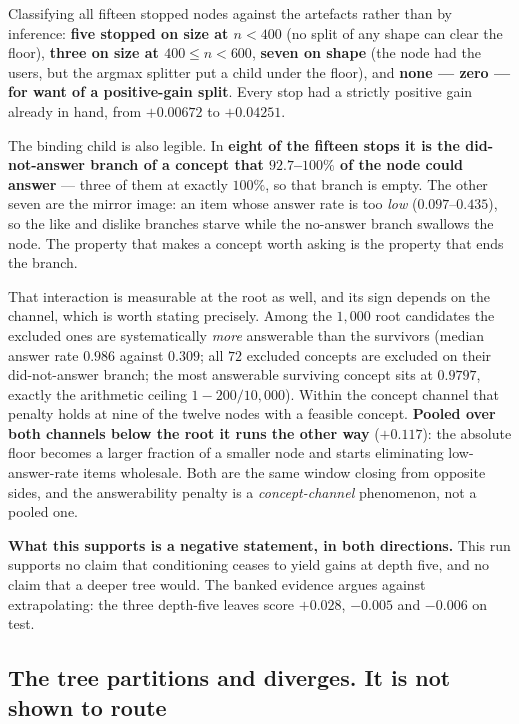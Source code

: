 \documentclass[11pt]{article}
\begin{document}
Classifying all fifteen stopped nodes against the artefacts rather than by inference: \textbf{five
stopped on size at $n<400$} (no split of any shape can clear the floor), \textbf{three on size at
$400\le n<600$}, \textbf{seven on shape} (the node had the users, but the argmax splitter put a child
under the floor), and \textbf{none --- zero --- for want of a positive-gain split}. Every stop had a
strictly positive gain already in hand, from $+0.00672$ to $+0.04251$.

The binding child is also legible. In \textbf{eight of the fifteen stops it is the did-not-answer
branch of a concept that $92.7$--$100\%$ of the node could answer} --- three of them at exactly
$100\%$, so that branch is empty. The other seven are the mirror image: an item whose answer rate is
too \emph{low} ($0.097$--$0.435$), so the like and dislike branches starve while the no-answer branch
swallows the node. The property that makes a concept worth asking is the property that ends the
branch.

That interaction is measurable at the root as well, and its sign depends on the channel, which is
worth stating precisely. Among the $1{,}000$ root candidates
the excluded ones are systematically \emph{more} answerable than the survivors (median answer rate
$0.986$ against $0.309$; all $72$ excluded concepts are excluded on their did-not-answer branch; the
most answerable surviving concept sits at $0.9797$, exactly the arithmetic ceiling $1-200/10{,}000$).
Within the concept channel that penalty holds at nine of the twelve nodes with a feasible concept.
\textbf{Pooled over both channels below the root it runs the other way} ($+0.117$): the absolute
floor becomes a larger fraction of a smaller node and starts eliminating low-answer-rate items
wholesale. Both are the same window closing from opposite sides, and the answerability penalty is a
\emph{concept-channel} phenomenon, not a pooled one.

\textbf{What this supports is a negative statement, in both directions.} This run supports no claim that
conditioning ceases to yield gains at depth five, and no claim that a deeper tree would. The banked
evidence argues against extrapolating: the three depth-five leaves score $+0.028$, $-0.005$ and
$-0.006$ on test.

\subsection{The tree partitions and diverges. It is not shown to route}
\label{sec:routing}
\end{document}

